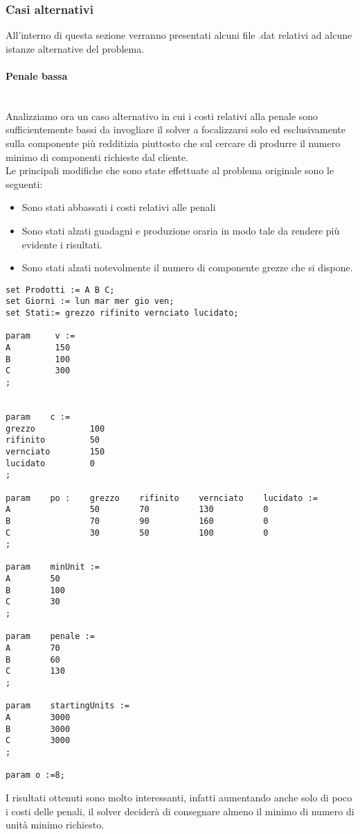 \documentclass[12pt]{article}
\begin{document}
\subsubsection{Casi alternativi}
All'interno di questa sezione verranno presentati alcuni file .dat relativi ad alcune istanze alternative del problema.
\paragraph{Penale bassa}\mbox{}\\
Analizziamo ora un caso alternativo in cui i costi relativi alla penale sono sufficientemente bassi da invogliare il solver a focalizzarsi solo ed esclusivamente sulla componente più redditizia piuttosto che sul cercare di produrre il numero minimo di componenti richieste dal cliente.\\
Le principali modifiche che sono state effettuate al problema originale sono le seguenti:
\begin{itemize}
	\item Sono stati abbassati i costi relativi alle penali
	\item Sono stati alzati guadagni e produzione oraria in modo tale da rendere più evidente i risultati.
	\item Sono stati alzati notevolmente il numero di componente grezze che si dispone.
\end{itemize}
\begin{lstlisting}
set Prodotti := A B C;
set Giorni := lun mar mer gio ven;
set Stati:= grezzo rifinito vernciato lucidato;

param     v :=
A		  150
B		  100
C		  300
;


param    c :=
grezzo   		 100
rifinito		 50
vernciato		 150
lucidato		 0
;

param 	 po :    grezzo    rifinito    vernciato    lucidato :=
A                50        70    	   130   		0         
B                70        90    	   160    		0
C                30        50   	   100   		0
;

param    minUnit :=
A		 50
B		 100
C		 30
;

param 	 penale :=
A		 70
B		 60
C		 130
;

param 	 startingUnits :=
A		 3000
B	  	 3000
C		 3000
;

param o :=8;
\end{lstlisting}
I risultati ottenuti sono molto interessanti, infatti aumentando anche solo di poco i costi delle penali, il solver deciderà di consegnare almeno il minimo di numero di unità minimo richiesto.\\
\end{document}
